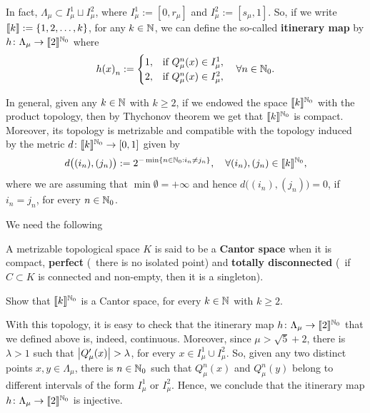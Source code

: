 In fact, $\Lambda_\mu\subset I_\mu^1\sqcup I_\mu^2$, where $I_\mu^1:=[0,r_\mu]$ and $I_\mu^2:=[s_\mu,1]$. So, if we write $\llbracket k\rrbracket:=\{1,2,\ldots,k\}$, for any $k\in\mathbb{N}$, we can define the so-called \textbf{itinerary map}  by $h\colon\Lambda_\mu\to\llbracket 2\rrbracket^{\mathbb{N}_0}$ where
\begin{displaymath}
  {h(x)}_n:=\begin{cases}
    1, &\text{if } Q_\mu^n(x)\in I_\mu^1,\\
    2, &\text{if } Q_\mu^n(x)\in I_\mu^2,
  \end{cases}\quad\forall n\in\mathbb{N}_0.
\end{displaymath}

In general, given any $k\in\mathbb{N}$ with $k\geq 2$, if we endowed the space $\llbracket k\rrbracket^{\mathbb{N}_0}$ with the product topology, then by Thychonov theorem we get that $\llbracket k\rrbracket^{\mathbb{N}_0}$ is compact. Moreover, its topology is metrizable and compatible with the topology induced by the metric $d\colon\llbracket k\rrbracket^{\mathbb{N}_0}\to [0,1]$ given by
\begin{displaymath}
  d\big((i_n),(j_n)\big):=2^{-\min\{n\in\mathbb{N}_0 : i_n\neq j_n\}},\quad\forall (i_n),(j_n)\in\llbracket k\rrbracket^{\mathbb{N}_0},
\end{displaymath}
where we are assuming that $\min\emptyset=+\infty$ and hence $d\big((i_n),(j_n)\big)=0$, if $i_n=j_n$, for every $n\in\mathbb{N}_0$.

We need the following

\begin{definition}
  A metrizable topological space $K$ is said to be a \textbf{Cantor space} when it is compact, \textbf{perfect} (\ie~there is no isolated point) and \textbf{totally disconnected} (\ie~if $C\subset K$ is connected and non-empty, then it is a singleton).
\end{definition}

\begin{exercise}
  Show that $\llbracket k\rrbracket^{\mathbb{N}_0}$ is a Cantor space, for every $k\in\mathbb{N}$ with $k\geq 2$.
\end{exercise}

With this topology, it is easy to check that the itinerary map $h\colon\Lambda_\mu\to\llbracket 2\rrbracket^{\mathbb{N}_0}$ that we defined above is, indeed, continuous. Moreover, since $\mu>\sqrt{5}+2$, there is $\lambda >1$ such that $\left\lvert{Q_\mu'(x)}\right\rvert>\lambda$, for every $x\in I_\mu^1\cup I_\mu^2$. So, given any two distinct points $x,y\in\Lambda_\mu$, there is $n\in\mathbb{N}_0$ such that $Q_\mu^n(x)$ and $Q_\mu^n(y)$ belong to different intervals of the form $I_\mu^1$ or $I_\mu^2$. Hence, we conclude that the itinerary map $h\colon\Lambda_\mu\to\llbracket 2\rrbracket^{\mathbb{N}_0}$ is injective.


